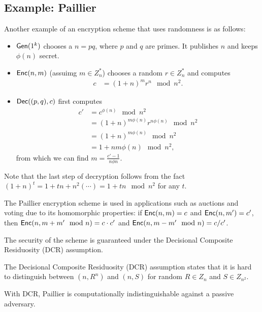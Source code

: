 \documentclass[10pt]{article}
\begin{document}
\subsection{Example: Paillier}

Another example of an encryption scheme that uses randomness is as follows:

\begin{itemize}
	\item $\mathsf{Gen}(1^k)$ chooses a $n=pq$, where $p$ and $q$ are primes. It publishes $n$ and keeps $\phi(n)$ secret.
	\item $\mathsf{Enc}(n,m)$ (assuimg $m \in Z_n^*$) chooses a random $r \in Z_n^*$ and computes
	\begin{align*}
	c &= (1+n)^mr^n \mod n^2.
	\end{align*}
	\item $\mathsf{Dec}((p,q),c)$ first computes
	\begin{align*}
	c' &= c^{\phi(n)} \mod n^2 \\
	&= (1+n)^{m \phi(n)} r^{n \phi(n)} \mod n^2 \\
	&= (1+n)^{m \phi(n)} \mod n^2 \\
	&= 1+nm \phi(n) \mod n^2,
	\end{align*}
	from which we can find $m = \frac{c'-1}{n \phi n}$.
\end{itemize}
Note that the last step of decryption follows from the fact $(1+n)^t = 1 + tn + n^2 ( \cdots ) = 1+tn \mod n^2$ for any $t$.

The Paillier encryption scheme is used in applications such as auctions and voting due to its homomorphic properties: if $\mathsf{Enc}(n, m) = c$ and $\mathsf{Enc}(n, m') = c'$, then $\mathsf{Enc}(n, m+m' \mod n) = c \cdot c'$ and $\mathsf{Enc}(n, m-m' \mod n) = c / c'$.

The security of the scheme is guaranteed under the Decisional Composite Residuosity (DCR) assumption. 
\begin{definition}
	The Decisional Composite Residuosity (DCR) assumption states that it is hard to distinguish between $(n, R^n)$ and $(n, S)$ for random $R \in Z_n$ and $S \in Z_{n^2}$.
\end{definition}
\noindent With DCR, Paillier is computationally indistinguishable against a passive adversary.

\nocite{*}


\end{document}
